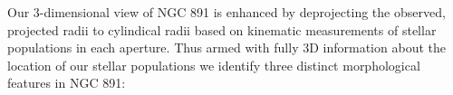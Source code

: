 

Our 3-dimensional view of NGC 891 is enhanced by deprojecting the
observed, projected radii to cylindical radii based on kinematic
measurements of stellar populations in each aperture. Thus armed with
fully 3D information about the location of our stellar populations we
identify three distinct morphological features in NGC 891:


